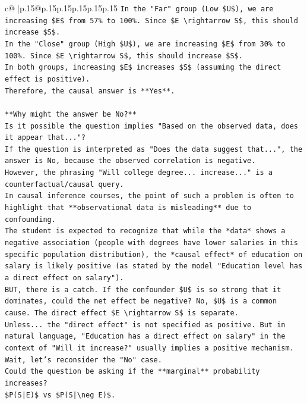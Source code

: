 \documentclass{article}
\begin{document}
{\begin{supertabular}{c@{$\;$}|p{.15\linewidth}@{}p{.15\linewidth}p{.15\linewidth}p{.15\linewidth}p{.15\linewidth}p{.15\linewidth}}
{{{\texttt{In the "Far" group (Low \$U\$), we are increasing \$E\$ from 57\% to 100\%. Since \$E \textbackslash{}rightarrow S\$, this should increase \$S\$.} \\
\texttt{In the "Close" group (High \$U\$), we are increasing \$E\$ from 30\% to 100\%. Since \$E \textbackslash{}rightarrow S\$, this should increase \$S\$.} \\
\texttt{In both groups, increasing \$E\$ increases \$S\$ (assuming the direct effect is positive).} \\
\texttt{Therefore, the causal answer is **Yes**.} \\
\\ 
\texttt{**Why might the answer be No?**} \\
\texttt{Is it possible the question implies "Based on the observed data, does it appear that..."?} \\
\texttt{If the question is interpreted as "Does the data suggest that...", the answer is No, because the observed correlation is negative.} \\
\texttt{However, the phrasing "Will college degree... increase..." is a counterfactual/causal query.} \\
\texttt{In causal inference courses, the point of such a problem is often to highlight that **observational data is misleading** due to confounding.} \\
\texttt{The student is expected to recognize that while the *data* shows a negative association (people with degrees have lower salaries in this specific population distribution), the *causal effect* of education on salary is likely positive (as stated by the model "Education level has a direct effect on salary").} \\
\texttt{BUT, there is a catch. If the confounder \$U\$ is so strong that it dominates, could the net effect be negative? No, \$U\$ is a common cause. The direct effect \$E \textbackslash{}rightarrow S\$ is separate.} \\
\texttt{Unless... the "direct effect" is not specified as positive. But in natural language, "Education has a direct effect on salary" in the context of "Will it increase?" usually implies a positive mechanism.} \\
\texttt{Wait, let's reconsider the "No" case.} \\
\texttt{Could the question be asking if the **marginal** probability increases?} \\
\texttt{\$P(S|E)\$ vs \$P(S|\textbackslash{}neg E)\$.} \\
}}}
\end{supertabular}}
\end{document}
